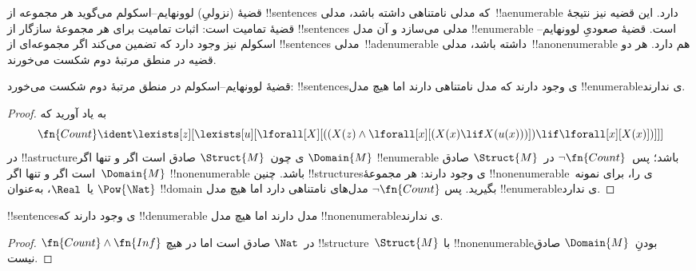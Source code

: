 \documentclass[../../../include/open-logic-section]{subfiles}
\begin{document}


\begin{explain}
قضیهٔ (نزولیِ) لوونهایم--اسکولم می‌گوید هر مجموعه از !!{sentence}s که
مدلی نامتناهی داشته باشد، مدلی~!!a{enumerable} دارد. این قضیه نیز نتیجهٔ
قضیهٔ تمامیت است: اثبات تمامیت برای هر مجموعهٔ سازگار از !!{sentence}s
مدلی می‌سازد و آن مدل !!{enumerable} است. قضیهٔ صعودیِ
لوونهایم--اسکولم نیز وجود دارد که تضمین می‌کند اگر مجموعه‌ای از
!!{sentence}s مدلی~!!a{denumerable} داشته باشد، مدلی~!!a{nonenumerable}
هم دارد. هر دو قضیه در منطق مرتبهٔ دوم شکست می‌خورند.
\end{explain}


\begin{thm}
 قضیهٔ لوونهایم--اسکولم در منطق مرتبهٔ دوم شکست
می‌خورد: !!{sentence}sی وجود دارند که مدل نامتناهی دارند اما هیچ مدل
!!{enumerable}ی ندارند.
\end{thm}

\begin{proof}
به یاد آورید که
\[
\fn{Count} \ident \lexists[z][\lexists[u][\lforall[X][((X(z) \land
      \lforall[x][(X(x) \lif X(u(x)))]) \lif \lforall[x][X(x)])]]]
\]
در !!a{structure}ی چون~$\Struct{M}$ صادق است اگر و تنها اگر
$\Domain{M}$ !!{enumerable} باشد؛ پس~$\lnot\fn{Count}$ در~$\Struct{M}$
صادق است اگر و تنها اگر~$\Domain{M}$ !!{nonenumerable} باشد. چنین
!!{structure}sی وجود دارند: هر مجموعهٔ !!{nonenumerable}ی را، برای
نمونه~$\Pow{\Nat}$ یا~$\Real$، به‌عنوان !!{domain} بگیرید. پس
$\lnot \fn{Count}$ مدل‌های نامتناهی دارد اما هیچ مدل !!{enumerable}ی
ندارد.
\end{proof}

\begin{thm}
!!{sentence}sی وجود دارند که !!{denumerable} مدل دارند اما هیچ مدل
!!{nonenumerable}ی ندارند.
\end{thm}

\begin{proof}
$\fn{Count} \land \fn{Inf}$ در~$\Nat$ صادق است اما در هیچ
!!{structure}~$\Struct{M}$ با !!{nonenumerable}بودنِ~$\Domain{M}$
صادق نیست.
\end{proof}
\end{document}
